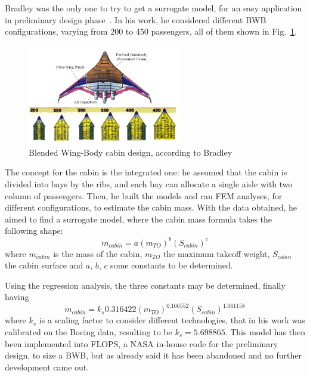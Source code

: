 Bradley was the only one to try to get a surrogate model, for an easy application in preliminary design phase~\cite{bib:bradley_bwb}.
In his work, he considered different BWB configurations, varying from 200 to 450 passengers, all of them shown in Fig.~\ref{fig:bwb_bradley_concept}. 
\begin{figure}[h!]
	\centering
	\includegraphics[keepaspectratio, width=0.6\textwidth]{images/chap1/bwb_bradley_concept.jpg}
	\caption{Blended Wing-Body cabin design, according to Bradley~\cite{bib:bradley_bwb}}
	\label{fig:bwb_bradley_concept}
\end{figure}
The concept for the cabin is the integrated one: he assumed that the cabin is divided into bays by the ribs, and each bay can allocate a single aisle with two column of passengers.
Then, he built the models and ran FEM analyses, for different configurations, to estimate the cabin mass. 
With the data obtained, he aimed to find a surrogate model, where the cabin mass formula takes the following shape:
\begin{equation}
	\label{eq:cabin_mass_general}
	m_{cabin} = a\left(m_{TO}\right)^b\left(S_{cabin}\right)^c
\end{equation}
where $m_{cabin}$ is the mass of the cabin, $m_{TO}$ the maximum takeoff weight, $S_{cabin}$ the cabin surface and $a$, $b$, $c$ some constants to be determined. 

Using the regression analysis, the three constants may be determined, finally having
\begin{equation}
	\label{eq:bwb_cabin_mass}
	m_{cabin} = k_s 0.316422 \left(m_{TO}\right)^{0.166552}\left(S_{cabin}\right)^{1.061158}
\end{equation}
where $k_s$ is a scaling factor to consider different technologies, that in his work was calibrated on the Boeing data, resulting to be $k_s=5.698865$. 
This model has then been implemented into FLOPS, a NASA in-house code for the preliminary design, to size a BWB, but as already said it has been abandoned and no further development came out. 

